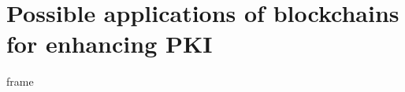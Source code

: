 \section[sec2]{Possible applications of blockchains for enhancing PKI}

\begin{frame}
frame
\end{frame}